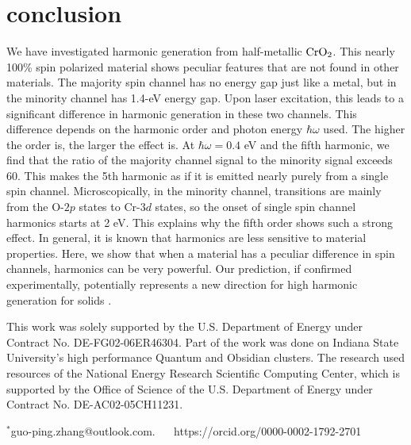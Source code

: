 \documentclass[checkin,showpacs,psfig,aps,pra]{revtex4}
\newcommand{\Cre}{$\rm CrO_{2}$}
\begin{document}
\section{conclusion}

We have investigated harmonic generation from half-metallic \Cre. This
nearly 100\% spin polarized material shows peculiar features that are
not found in other materials. The majority spin channel has no energy
gap just like a metal, but in the minority channel has 1.4-eV energy
gap. Upon laser excitation, this leads to a significant difference in
harmonic generation in these two channels. This difference depends on
the harmonic order and photon energy $\hbar\omega$ used. The higher
the order is, the larger the effect is. At $\hbar\omega=0.4$ eV and
the fifth harmonic, we find that the ratio of the majority channel
signal to the minority signal exceeds 60. This makes the 5th harmonic
as if it is emitted {nearly} purely from a single spin
channel. Microscopically, in the minority channel, transitions are
mainly from the O-$2p$ states to Cr-$3d$ states, so the onset of
single spin channel harmonics starts at 2 eV. This explains why the
fifth order shows such a strong effect. In general, it is known that
harmonics are less sensitive to material properties. Here, we show
that when a material has a peculiar difference in spin channels,
harmonics can be very powerful.  Our prediction, if confirmed
experimentally, potentially represents a new direction for high
harmonic generation for solids
\cite{ghimire2011,luu2015,garg2016,nd,neufeld2019}.


\acknowledgments
This work was solely supported by the U.S. Department of Energy under
Contract No. DE-FG02-06ER46304. Part of the work was done on Indiana
State University's high performance Quantum and Obsidian clusters.
The research used resources of the National Energy Research Scientific
Computing Center, which is supported by the Office of Science of the
U.S. Department of Energy under Contract No. DE-AC02-05CH11231.



$^*$guo-ping.zhang@outlook.com. ~~  https://orcid.org/0000-0002-1792-2701
\end{document}
